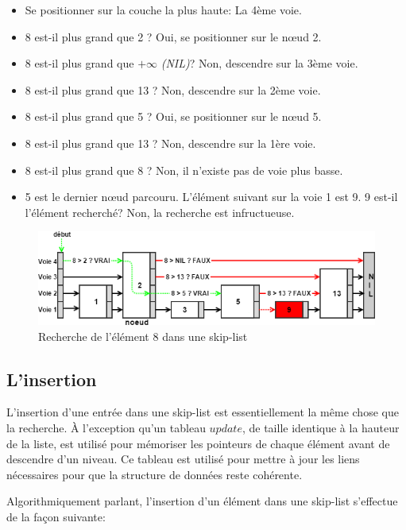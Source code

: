 \documentclass[hidelinks,a4paper, 12pt]{article}
\begin{document}
	\begin{itemize}
		\item Se positionner sur la couche la plus haute: La 4ème voie.
		\item 8 est-il plus grand que 2 ? Oui, se positionner sur le nœud 2.
		\item 8 est-il plus grand que $+\infty$ \textit{(NIL)}? Non, descendre sur la 3ème voie.
		\item 8 est-il plus grand que 13  ? Non, descendre sur la 2ème voie.
		\item 8 est-il plus grand que 5 ? Oui, se positionner sur le nœud 5.
		\item 8 est-il plus grand que 13 ? Non, descendre sur la 1ère voie.
		\item 8 est-il plus grand que 8 ? Non, il n'existe pas de voie plus basse.
		\item 5 est le dernier nœud parcouru. L'élément suivant sur la voie 1 est 9. 9 est-il l'élément recherché? Non, la recherche est infructueuse.
	\end{itemize}
	\begin{figure}[h]
		\includegraphics[width=\textwidth]{img/search2}
		\caption{Recherche de l'élément 8 dans une skip-list}
		\label{SkipSearch2}
	\end{figure}
	
	
	\newpage
	\subsection{L'insertion}
	L'insertion d'une entrée dans une skip-list est essentiellement la même chose que la recherche. À l'exception qu'un tableau $update$, de taille identique à la hauteur de la liste, est utilisé pour mémoriser les pointeurs de chaque élément avant de descendre d'un niveau. Ce tableau est utilisé pour mettre à jour les liens nécessaires pour que la structure de données reste cohérente.
	
	Algorithmiquement parlant, l'insertion d'un élément dans une skip-list s'effectue de la façon suivante:
	
\end{document}
